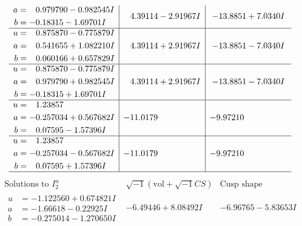 \documentclass[1p]{elsarticle_modified}
\theoremstyle{definition}
\newcommand{\I}{\sqrt{-1}}
\begin{document}
$$\begin{array}{c|c|c}
\begin{aligned}
a &= \phantom{-}0.979790 - 0.982545 I \\
b &= -0.18315 - 1.69701 I\end{aligned}
 & \phantom{-}4.39114 - 2.91967 I & -13.8851 + 7.0340 I \\ \hline\begin{aligned}
u &= \phantom{-}0.875870 - 0.775879 I \\
a &= \phantom{-}0.541655 + 1.082210 I \\
b &= \phantom{-}0.060166 + 0.657829 I\end{aligned}
 & \phantom{-}4.39114 + 2.91967 I & -13.8851 - 7.0340 I \\ \hline\begin{aligned}
u &= \phantom{-}0.875870 - 0.775879 I \\
a &= \phantom{-}0.979790 + 0.982545 I \\
b &= -0.18315 + 1.69701 I\end{aligned}
 & \phantom{-}4.39114 + 2.91967 I & -13.8851 - 7.0340 I \\ \hline\begin{aligned}
u &= \phantom{-}1.23857\phantom{ +0.000000I} \\
a &= -0.257034 + 0.567682 I \\
b &= \phantom{-}0.07595 - 1.57396 I\end{aligned}
 & -11.0179\phantom{ +0.000000I} & -9.97210\phantom{ +0.000000I} \\ \hline\begin{aligned}
u &= \phantom{-}1.23857\phantom{ +0.000000I} \\
a &= -0.257034 - 0.567682 I \\
b &= \phantom{-}0.07595 + 1.57396 I\end{aligned}
 & -11.0179\phantom{ +0.000000I} & -9.97210\phantom{ +0.000000I}\\
 \hline 
 \end{array}$$\newpage$$\begin{array}{c|c|c}  
\text{Solutions to }I^u_{2}& \I (\text{vol} + \sqrt{-1}CS) & \text{Cusp shape}\\
 \hline 
\begin{aligned}
u &= -1.122560 + 0.674821 I \\
a &= -1.66618 - 0.22925 I \\
b &= -0.275014 - 1.270650 I\end{aligned}
 & -6.49446 + 8.08492 I & -6.96765 - 5.83653 I \\ \hline\begin{aligned}

\end{aligned}
\end{array}$$
\end{document}
